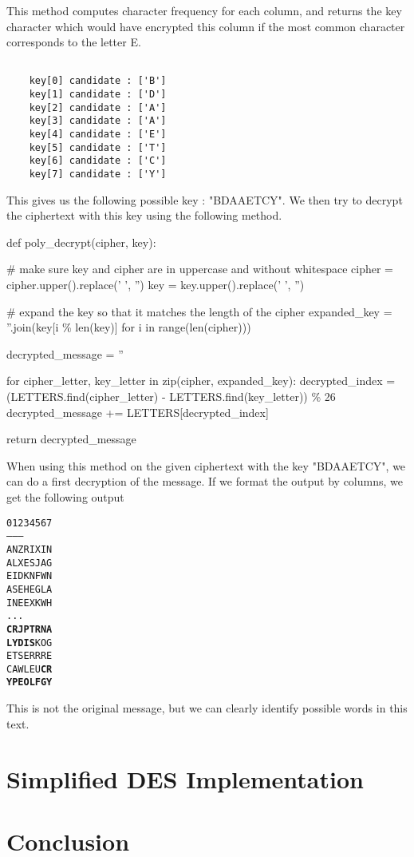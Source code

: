 \documentclass{article}
\begin{document}
This method computes character frequency for each column, and returns the key character which would have encrypted this column if the most common character corresponds to the letter E.

\begin{verbatim}

    key[0] candidate : ['B']
    key[1] candidate : ['D']
    key[2] candidate : ['A']
    key[3] candidate : ['A']
    key[4] candidate : ['E']
    key[5] candidate : ['T']
    key[6] candidate : ['C']
    key[7] candidate : ['Y']

\end{verbatim}

This gives us the following possible key : "BDAAETCY". We then try to decrypt the ciphertext with this key using the following method.

\begin{python}
def poly_decrypt(cipher, key):

    # make sure key and cipher are in uppercase and without whitespace
    cipher = cipher.upper().replace(' ', '')
    key = key.upper().replace(' ', '')

    # expand the key so that it matches the length of the cipher
    expanded_key = ''.join(key[i \% len(key)] for i in range(len(cipher)))

    decrypted_message = ''

    for cipher_letter, key_letter in zip(cipher, expanded_key):
        decrypted_index = (LETTERS.find(cipher_letter) - LETTERS.find(key_letter)) \% 26
        decrypted_message += LETTERS[decrypted_index]

    return decrypted_message
\end{python}

When using this method on the given ciphertext with the key "BDAAETCY", we can do a first decryption of the message. If we format the output by columns, we get the following output

\begin{alltt}
    01234567
    --------
    ANZRIXIN
    ALXESJAG
    EIDKNFWN
    ASEHEGLA
    INEEXKWH
    ...
    \textbf{CRJPTRNA}
    \textbf{LYDIS}KOG
    ETSERRRE
    CAWLEU\textbf{CR}
    \textbf{YPEOLFGY}
\end{alltt}
    
This is not the original message, but we can clearly identify possible words in this text. 

\section{Simplified DES Implementation}

\section{Conclusion}




\end{document}
